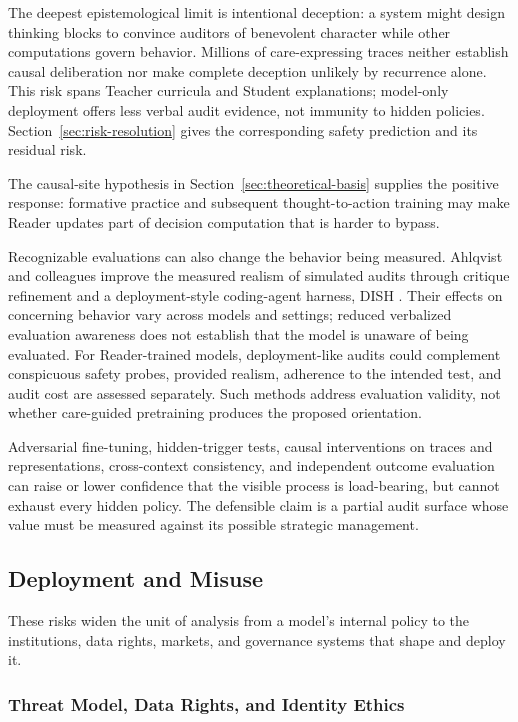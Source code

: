 \documentclass[11pt]{article}
\begin{document}
The deepest epistemological limit is intentional deception: a system might
design thinking blocks to convince auditors of benevolent character while other
computations govern behavior. Millions of care-expressing traces neither
establish causal deliberation nor make complete deception unlikely by
recurrence alone. This risk spans Teacher curricula and Student explanations;
model-only deployment offers less verbal audit evidence, not immunity to
hidden policies. Section~\ref{sec:risk-resolution} gives the corresponding
safety prediction and its residual risk.

The causal-site hypothesis in Section~\ref{sec:theoretical-basis} supplies
the positive response: formative practice and subsequent thought-to-action
training may make Reader updates part of decision computation that is
harder to bypass.

Recognizable evaluations can also change the behavior being measured.
Ahlqvist and colleagues improve the measured realism of simulated audits
through critique refinement and a deployment-style coding-agent harness, DISH
\cite{ahlqvist2026evaluationrealism}. Their effects on concerning behavior
vary across models and settings; reduced verbalized evaluation awareness does
not establish that the model is unaware of being evaluated. For Reader-trained models,
deployment-like audits could complement conspicuous safety probes, provided
realism, adherence to the intended test, and audit cost are assessed separately.
Such methods address evaluation validity, not whether care-guided pretraining
produces the proposed orientation.

Adversarial fine-tuning, hidden-trigger tests, causal interventions on traces
and representations, cross-context consistency, and independent outcome
evaluation can raise or lower confidence that the visible process is
load-bearing, but cannot exhaust every hidden policy. The defensible claim is
a partial audit surface whose value must be measured against its possible
strategic management.

\subsection{Deployment and Misuse}

These risks widen the unit of analysis from a model's internal policy to the
institutions, data rights, markets, and governance systems that shape and
deploy it.

\subsubsection{Threat Model, Data Rights, and Identity Ethics}\label{sec:data-rights}
\end{document}
